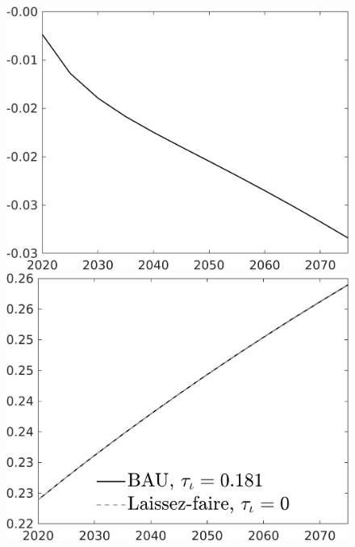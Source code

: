 \documentclass[12pt]{article}
\begin{document}
\begin{figure}[h!!]
\begin{minipage}[]{0.32\textwidth}
	\end{minipage}
	\begin{minipage}[]{0.32\textwidth}
		\includegraphics[width=1\textwidth]{../../codding_model/own_basedOnFried/optimalPol_010922_revision/figures/all_13Sept22/CompTaul_Equlab_LFBAUPer_Reg0_AgAf_spillover0_nsk0_xgr0_knspil0_sep1_countec0_GovRev0_etaa0.79.png}
	\end{minipage}
	\begin{minipage}[]{0.32\textwidth}
		\includegraphics[width=1\textwidth]{../../codding_model/own_basedOnFried/optimalPol_010922_revision/figures/all_13Sept22/CompTaul_Equlab_LFBAU_Reg0_pf_spillover0_nsk0_xgr0_knspil0_sep1_countec0_GovRev0_etaa0.79_lgd1.png}

\end{minipage}
\end{figure}
\end{document}
